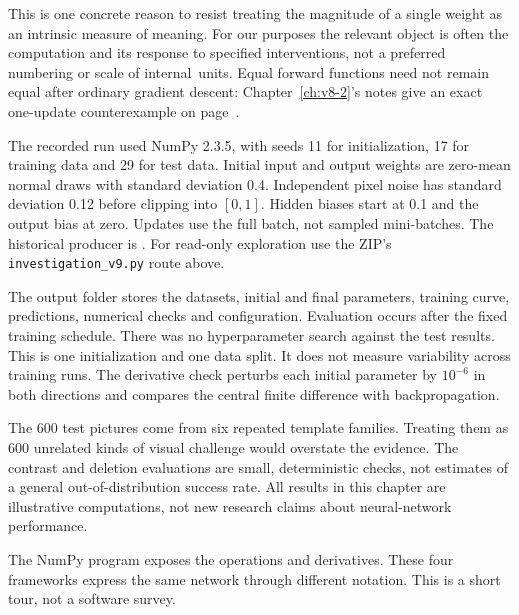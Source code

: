 This is one concrete reason to resist treating the magnitude of a single weight as an intrinsic measure of meaning. For our purposes the relevant object is often the computation and its response to specified interventions, not a preferred numbering or scale of internal~units. Equal forward functions need not remain equal after ordinary gradient descent: Chapter~\ref{ch:v8-2}'s notes give an exact one-update counterexample on page~\pageref{note:v29-equivalent-updates}.




The recorded run used NumPy 2.3.5, with seeds 11 for initialization, 17 for training data and 29 for test data. Initial input and output weights are zero-mean normal draws with standard deviation 0.4. Independent pixel noise has standard deviation 0.12 before clipping into $[0,1]$. Hidden biases start at 0.1 and the output bias at zero. Updates use the full batch, not sampled mini-batches. The historical producer is . For read-only exploration use the ZIP's \texttt{investigation\_v9.py} route above.

The output folder stores the datasets, initial and final parameters, training curve, predictions, numerical checks and configuration. Evaluation occurs after the fixed training schedule. There was no hyperparameter search against the test results. This is one initialization and one data split. It does not measure variability across training runs. The derivative check perturbs each initial parameter by $10^{-6}$ in both directions and compares the central finite difference with backpropagation.

The 600 test pictures come from six repeated template families. Treating them as 600 unrelated kinds of visual challenge would overstate the evidence. The contrast and deletion evaluations are small, deterministic checks, not estimates of a general out-of-distribution success rate. All results in this chapter are illustrative computations, not new research claims about neural-network performance.





The NumPy program exposes the operations and derivatives. These four frameworks express the same network through different notation. This is a short tour, not a software survey.

